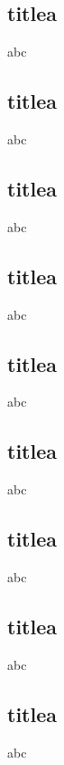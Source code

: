 \documentclass[compress]{beamer}
\begin{document}
\subsection{titlea}

\begin{frame}
    abc
\end{frame} 
\subsection{titlea}
\begin{frame}
    abc
\end{frame} 
\subsection{titlea}
\begin{frame}
    abc
\end{frame} 
\subsection{titlea}
\begin{frame}
    abc
\end{frame} 
\subsection{titlea}

\begin{frame}
    abc
\end{frame} 
\subsection{titlea}
\begin{frame}
    abc
\end{frame} 
\subsection{titlea}
\begin{frame}
    abc
\end{frame} 
\subsection{titlea}
\begin{frame}
    abc
\end{frame} 
\subsection{titlea}
\begin{frame}
    abc
\end{frame} 
\end{document}
